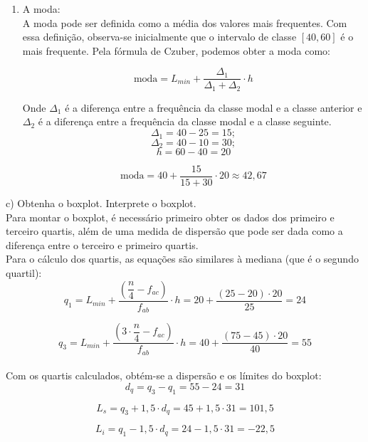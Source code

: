 \begin{enumerate}[label=(\roman*)]
    \item A moda:
          \\

          A moda pode ser definida como a média dos valores mais frequentes. Com essa definição, observa-se inicialmente que o intervalo de classe $[40,60]$ é o mais frequente. Pela fórmula de Czuber, podemos obter a moda como:

          \[
              \text{moda} = L_{min} + \frac{\varDelta_1}{\varDelta_1 + \varDelta_2} \cdot h
          \]

          Onde $\varDelta_1$ é a diferença entre a frequência da classe modal e a classe anterior e $\varDelta_2$ é a diferença entre a frequência da classe modal e a classe seguinte.
          \\
          \[\varDelta_1 = 40 - 25 = 15; \]
          \[\varDelta_2 = 40 - 10 = 30; \]
          \[h= 60-40=20 \]

          \begin{equation}
              \text{moda} = 40 + \frac{15}{15+30} \cdot 20 \approx  42,67
          \end{equation}
\end{enumerate}

c) Obtenha o boxplot. Interprete o boxplot.
\\

Para montar o boxplot, é necessário primeiro obter os dados dos primeiro e terceiro quartis, além de uma medida de dispersão que pode ser dada como a diferença entre o terceiro e primeiro quartis.
\\

Para o cálculo dos quartis, as equações são similares à mediana (que é o segundo quartil):
\\

\[
    q_1 = L_{min} + \frac{\left(\dfrac{n}{4}-f_{ac}\right)}{f_{ab}}\cdot h = 20 + \frac{(25-20)\cdot 20}{25} = 24
\]

\[
    q_3 = L_{min} + \frac{\left(3\cdot\dfrac{n}{4}-f_{ac}\right)}{f_{ab}}\cdot h = 40 + \frac{(75-45)\cdot 20}{40} = 55
\]
\\

Com os quartis calculados, obtém-se a dispersão e os límites do boxplot:
\\

\[
    d_q = q_3 - q_1 = 55 - 24 = 31
\]

\[
    L_s = q_3 + 1,5\cdot d_q = 45 +1,5\cdot 31 = 101,5
\]

\[
    L_i = q_1 - 1,5\cdot d_q = 24 - 1,5\cdot 31 = -22,5
\]
\\

